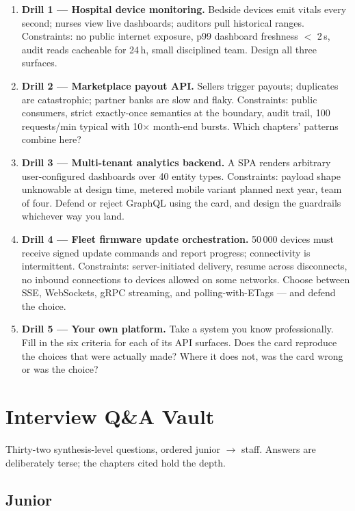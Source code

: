 \begin{enumerate}
  \item \textbf{Drill 1 --- Hospital device monitoring.} Bedside devices
        emit vitals every second; nurses view live dashboards; auditors pull
        historical ranges. Constraints: no public internet exposure, p99
        dashboard freshness $<$ 2\,s, audit reads cacheable for 24\,h,
        small disciplined team. Design all three surfaces.
  \item \textbf{Drill 2 --- Marketplace payout API.} Sellers trigger
        payouts; duplicates are catastrophic; partner banks are slow and
        flaky. Constraints: public consumers, strict exactly-once semantics
        at the boundary, audit trail, 100 requests/min typical with 10$\times$
        month-end bursts. Which chapters' patterns combine here?
  \item \textbf{Drill 3 --- Multi-tenant analytics backend.} A SPA renders
        arbitrary user-configured dashboards over 40 entity types.
        Constraints: payload shape unknowable at design time, metered mobile
        variant planned next year, team of four. Defend or reject GraphQL
        using the card, and design the guardrails whichever way you land.
  \item \textbf{Drill 4 --- Fleet firmware update orchestration.} 50\,000
        devices must receive signed update commands and report progress;
        connectivity is intermittent. Constraints: server-initiated delivery,
        resume across disconnects, no inbound connections to devices allowed
        on some networks. Choose between SSE, WebSockets, gRPC streaming,
        and polling-with-ETags --- and defend the choice.
  \item \textbf{Drill 5 --- Your own platform.} Take a system you know
        professionally. Fill in the six criteria for each of its API
        surfaces. Does the card reproduce the choices that were actually
        made? Where it does not, was the card wrong or was the choice?
\end{enumerate}

\section{Interview Q\&A Vault}

Thirty-two synthesis-level questions, ordered junior $\rightarrow$ staff.
Answers are deliberately terse; the chapters cited hold the depth.

\subsection*{Junior}

